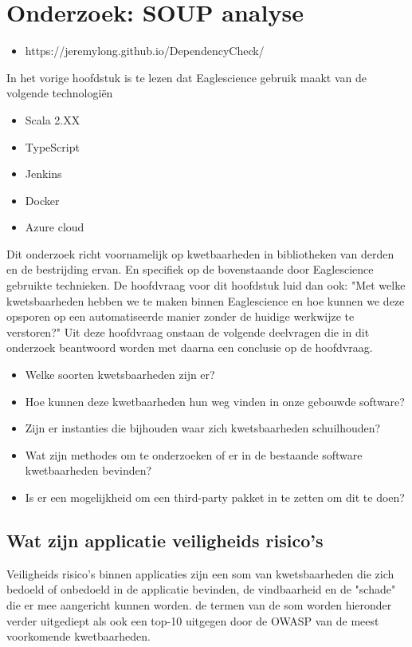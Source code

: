 
\chapter{Onderzoek: SOUP analyse} %

\begin{itemize}
\item https://jeremylong.github.io/DependencyCheck/
\end{itemize}

\label{OndSOUPAnalyse} %
In het vorige hoofdstuk is te lezen dat Eaglescience gebruik maakt van de volgende technologi\"en
\begin{itemize}
  \item Scala 2.XX
  \item TypeScript
  \item Jenkins
  \item Docker
  \item Azure cloud
\end{itemize}
Dit onderzoek richt voornamelijk op kwetbaarheden in bibliotheken  van derden en de bestrijding ervan.
En specifiek op de bovenstaande door Eaglescience gebruikte technieken.
De hoofdvraag voor dit hoofdstuk luid dan ook: "Met welke kwetsbaarheden hebben we te maken binnen Eaglescience en hoe kunnen we deze opsporen op een automatiseerde manier zonder de huidige werkwijze te verstoren?" Uit deze hoofdvraag onstaan de volgende deelvragen die in dit onderzoek beantwoord worden met daarna een conclusie op de hoofdvraag.

\begin{itemize}
\item Welke soorten kwetsbaarheden zijn er?
\item Hoe kunnen deze kwetbaarheden hun weg vinden in onze gebouwde software?
\item Zijn er instanties die bijhouden waar zich kwetsbaarheden schuilhouden?
\item Wat zijn methodes om te onderzoeken of er in de bestaande software kwetbaarheden bevinden?
\item Is er een mogelijkheid om een third-party pakket in te zetten om dit te doen?
\end{itemize}

\section{Wat zijn applicatie veiligheids risico's}
Veiligheids risico's binnen applicaties zijn een som van kwetsbaarheden die zich bedoeld of onbedoeld in de applicatie bevinden, de vindbaarheid en de "schade" die er mee aangericht kunnen worden. de termen van de som worden hieronder verder uitgediept als ook een top-10 uitgegen door de OWASP van de meest voorkomende kwetbaarheden.

